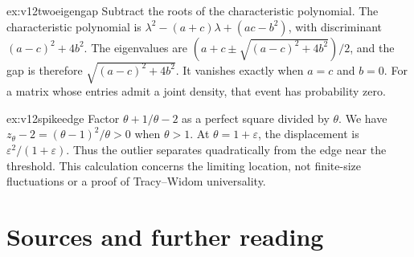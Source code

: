 \begin{solution}{ex:v12twoeigengap}
\idea Subtract the roots of the characteristic polynomial.
\writeup The characteristic polynomial is $\lambda^2-(a+c)\lambda+(ac-b^2)$, with discriminant $(a-c)^2+4b^2$. The eigenvalues are $(a+c\pm\sqrt{(a-c)^2+4b^2})/2$, and the gap is therefore $\sqrt{(a-c)^2+4b^2}$. It vanishes exactly when $a=c$ and $b=0$. For a matrix whose entries admit a joint density, that event has probability zero.
\end{solution}

\begin{solution}{ex:v12spikeedge}
\idea Factor $\theta+1/\theta-2$ as a perfect square divided by $\theta$.
\writeup We have $z_\theta-2=(\theta-1)^2/\theta>0$ when $\theta>1$. At $\theta=1+\varepsilon$, the displacement is $\varepsilon^2/(1+\varepsilon)$. Thus the outlier separates quadratically from the edge near the threshold. This calculation concerns the limiting location, not finite-size fluctuations or a proof of Tracy--Widom universality.
\end{solution}

\section*{Sources and further reading}

